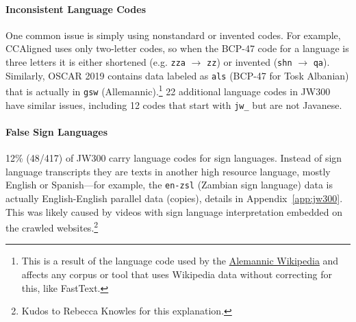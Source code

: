 \paragraph{Inconsistent Language Codes} One common issue is simply using nonstandard or invented codes. For example, CCAligned uses only two-letter codes, so when the BCP-47 code for a language is three letters it is either shortened (e.g. \texttt{zza} $\rightarrow$ \texttt{zz})
or invented (\texttt{shn}  $\rightarrow$ \texttt{qa}).
Similarly, OSCAR 2019 contains data labeled as \texttt{als} (BCP-47 for Tosk Albanian) that is actually in \texttt{gsw} (Allemannic).\footnote{This is a result of the language code used by the \href{https://en.wikipedia.org/wiki/Alemannic\_Wikipedia}{Alemannic Wikipedia} and affects any corpus or tool that uses Wikipedia data without correcting for this, like FastText.}
22 additional language codes in JW300 have similar issues,
including 12 codes that start with \texttt{jw\_} but are not %
Javanese.

\paragraph{False Sign Languages}
12\% (48/417) of JW300
carry language codes for sign languages. %
Instead of sign language transcripts they are texts in another high resource language, mostly English or Spanish---for example, the \texttt{en-zsl} (Zambian sign language) data is actually English-English parallel data (copies), details in Appendix~\ref{app:jw300}. This was likely caused by videos with sign language interpretation embedded on the crawled websites.\footnote{Kudos to Rebecca Knowles for this explanation.} %


